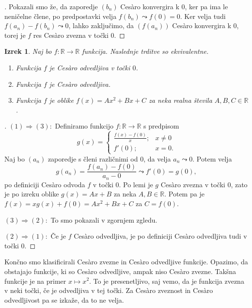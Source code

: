 \documentclass[a4paper,12pt]{article}
\theoremstyle{definition}
\theoremstyle{plain}
\newtheorem{izrek}{Izrek}
\newenvironment{dokaz}{\begin{proof}[\bfseries\upshape\proofname]}{\end{proof}}
\begin{document}
\begin{dokaz}
    Pokazali smo že, da zaporedje $(b_n)$ Ces\`{a}ro konvergira k $0$, ker pa ima le neničelne člene, po predpostavki velja $f(b_n) \leadsto f(0) = 0$. Ker velja tudi $f(a_n) - f(b_n) \leadsto 0$, lahko zaključimo, da $(f(a_n))$ Ces\`{a}ro konvergira k $0$, torej je $f$ res Ces\`{a}ro zvezna v točki $0$.
\end{dokaz}

\begin{izrek}
    Naj bo $f: \mathbb{R} \rightarrow \mathbb{R}$ funkcija. Naslednje trditve so ekvivalentne.
    \begin{enumerate}
        \item Funkcija $f$ je Ces\`{a}ro odvedljiva v točki $0$.
        \item Funkcija $f$ je Ces\`{a}ro odvedljiva.
        \item Funkcija $f$ je oblike $f(x) = Ax^2 + Bx + C$ za neka realna števila $A, B, C \in \mathbb{R}$.
    \end{enumerate}
\end{izrek}
\begin{dokaz}
    $(1) \Rightarrow (3): $ Definiramo funkcijo $f: \mathbb{R} \rightarrow \mathbb{R}$ s predpisom 
    $$
    g(x) = \begin{cases}
        \frac{f(x)-f(0)}{x}; & x \neq 0\\
        f'(0); & x = 0.
    \end{cases}
    $$
    Naj bo $(a_n)$ zaporedje s členi različnimi od $0$, da velja $a_n \leadsto 0$. Potem velja 
    $$g(a_n) = \frac{f(a_n)-f(0)}{a_n-0} \leadsto f'(0) = g(0),$$
    po definiciji Ces\`{a}ro odvoda $f$ v točki $0$. Po lemi je $g$ Ces\`{a}ro zvezna v točki $0$, zato je po izreku oblike $g(x) = Ax + B$ za neka $A, B \in \mathbb{R}$. Potem pa je 
    $f(x) = xg(x) + f(0) = Ax^2 + Bx + C$ za $C = f(0)$.

    $(3) \Rightarrow (2): $ To smo pokazali v zgornjem zgledu.

    $(2) \Rightarrow (1): $ Če je $f$ Ces\`{a}ro odvedljiva, je po definiciji Ces\`{a}ro odvedljiva tudi v točki $0$.
\end{dokaz}
Končno smo klasificirali Ces\`{a}ro zvezne in Ces\`{a}ro odvedljive funkcije. Opazimo, da obstajajo funkcije, ki so Ces\`{a}ro odvedljive, ampak niso Ces\`{a}ro zvezne. Takšna funkcije je na primer $x \mapsto x^2$. To je presenetljivo, saj vemo, da je funkcija zvezna v neki točki, če je odvedljiva v tej točki. Za Ces\`{a}ro zveznost in Ces\`{a}ro odvedljivost pa se izkaže, da to ne velja.
\end{document}
